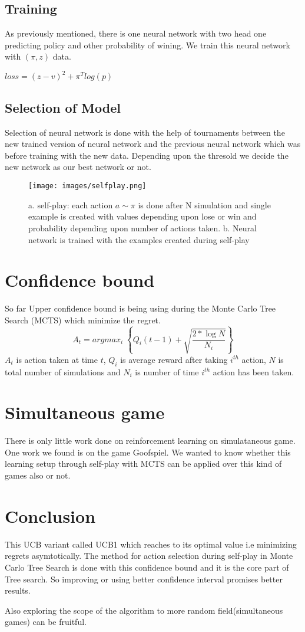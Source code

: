 \subsection{Training}
As previously mentioned, there is one neural network with two head one predicting policy and other probability of wining. We train this neural network with $(\pi,z)$ data. 


$loss = (z-v)^{2} + \pi^{T}log(p)$ 
\subsection{Selection of Model}
Selection of neural network is done with the help of tournaments between the new trained version of neural network and the previous neural network which was before training with the new data. Depending upon the thresold we decide the new network as our best network or not.

\begin{figure}
    [!htb]\centering
    \texttt{[image: images/selfplay.png]}
    \caption{a. self-play: each action $a \sim \pi $ is done after N simulation and single example is created with values depending upon lose or win and probability depending upon number of actions taken. b. Neural network is trained with the examples created during self-play  }
  \label{fig:phase}
  \end{figure}

\section{Confidence bound}
So far Upper confidence bound is being using during the Monte Carlo Tree Search (MCTS)\cite{mcts} which minimize the regret.$$ A_{t} = argmax_{i}\; \left \lbrace Q_{i}(t-1) + \sqrt{\dfrac{2* \log N}{N_{i}}} \right \rbrace $$
$A_{t}$ is action taken at time $t$, $Q_{i}$ is average reward after taking $i^{th}$ action, $N$ is total number of simulations and $N_{i}$ is number of time $i^{th}$ action has been taken.

\section{Simultaneous game}
There is only little work done on reinforcement learning on simulataneous game. One work we found is on the game Goofspiel. We wanted to know whether this learning setup through self-play with MCTS can be applied over this kind of games also or not.

\section{Conclusion}
This UCB \cite{ucb} variant called UCB1 which reaches to its optimal value i.e minimizing regrets asymtotically. The method for action selection during self-play in Monte Carlo Tree Search is done with this confidence bound and it is the core part of Tree search. So improving or using better confidence interval promises better results.


Also exploring the scope of the algorithm to more random field(simultaneous games) can be fruitful.

